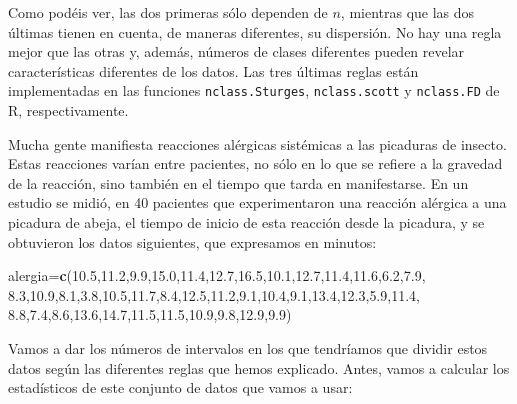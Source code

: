 \documentclass[]{book}
\newenvironment{Shaded}{\begin{snugshade}}{\end{snugshade}}
\newcommand{\FloatTok}[1]{\textcolor[rgb]{0.00,0.00,0.81}{#1}}
\newcommand{\KeywordTok}[1]{\textcolor[rgb]{0.13,0.29,0.53}{\textbf{#1}}}
\newcommand{\NormalTok}[1]{#1}
\theoremstyle{definition}
\theoremstyle{definition}
\theoremstyle{definition}
\theoremstyle{remark}
\let\BeginKnitrBlock\begin \let\EndKnitrBlock\end
\begin{document}
Como podéis ver, las dos primeras sólo dependen de \(n\), mientras que las dos últimas tienen en cuenta, de maneras diferentes, su dispersión. No hay una regla mejor que las otras y, además, números de clases diferentes pueden revelar características diferentes de los datos. Las tres últimas reglas están implementadas en las funciones \texttt{nclass.Sturges}, \texttt{nclass.scott} y \texttt{nclass.FD} de R, respectivamente.

\BeginKnitrBlock{example}
\protect\hypertarget{exm:alerg}{}{\label{exm:alerg} }Mucha gente manifiesta reacciones alérgicas sistémicas a las picaduras de insecto. Estas reacciones varían entre pacientes, no sólo en lo que se refiere a la gravedad de la reacción, sino también en el tiempo que tarda en manifestarse. En un estudio se midió, en 40 pacientes que experimentaron una reacción alérgica a una picadura de abeja, el tiempo de inicio de esta reacción desde la picadura, y se obtuvieron los datos siguientes, que expresamos en minutos:
\EndKnitrBlock{example}

\begin{Shaded}
\begin{Highlighting}[]
\NormalTok{alergia=}\KeywordTok{c}\NormalTok{(}\FloatTok{10.5}\NormalTok{,}\FloatTok{11.2}\NormalTok{,}\FloatTok{9.9}\NormalTok{,}\FloatTok{15.0}\NormalTok{,}\FloatTok{11.4}\NormalTok{,}\FloatTok{12.7}\NormalTok{,}\FloatTok{16.5}\NormalTok{,}\FloatTok{10.1}\NormalTok{,}\FloatTok{12.7}\NormalTok{,}\FloatTok{11.4}\NormalTok{,}\FloatTok{11.6}\NormalTok{,}\FloatTok{6.2}\NormalTok{,}\FloatTok{7.9}\NormalTok{,}
  \FloatTok{8.3}\NormalTok{,}\FloatTok{10.9}\NormalTok{,}\FloatTok{8.1}\NormalTok{,}\FloatTok{3.8}\NormalTok{,}\FloatTok{10.5}\NormalTok{,}\FloatTok{11.7}\NormalTok{,}\FloatTok{8.4}\NormalTok{,}\FloatTok{12.5}\NormalTok{,}\FloatTok{11.2}\NormalTok{,}\FloatTok{9.1}\NormalTok{,}\FloatTok{10.4}\NormalTok{,}\FloatTok{9.1}\NormalTok{,}\FloatTok{13.4}\NormalTok{,}\FloatTok{12.3}\NormalTok{,}\FloatTok{5.9}\NormalTok{,}\FloatTok{11.4}\NormalTok{,}
  \FloatTok{8.8}\NormalTok{,}\FloatTok{7.4}\NormalTok{,}\FloatTok{8.6}\NormalTok{,}\FloatTok{13.6}\NormalTok{,}\FloatTok{14.7}\NormalTok{,}\FloatTok{11.5}\NormalTok{,}\FloatTok{11.5}\NormalTok{,}\FloatTok{10.9}\NormalTok{,}\FloatTok{9.8}\NormalTok{,}\FloatTok{12.9}\NormalTok{,}\FloatTok{9.9}\NormalTok{)}
\end{Highlighting}
\end{Shaded}

Vamos a dar los números de intervalos en los que tendríamos que dividir estos datos según las diferentes reglas que hemos explicado. Antes, vamos a calcular los estadísticos de este conjunto de datos que vamos a usar:
\end{document}
